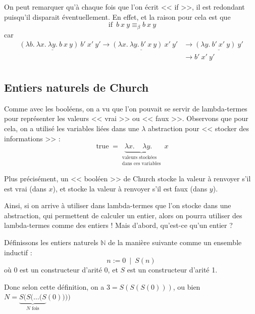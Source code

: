 \documentclass[11pt]{article}
\begin{document}
\begin{remark}
    On peut remarquer qu'à chaque fois que l'on écrit << if >>, il est redondant puisqu'il disparait éventuellement. En effet, et la raison pour cela est que
    $$\operatorname{if}~b~x~y \equiv_\beta b~x~y$$
    car
    \begin{equation*}
    \begin{aligned}
        \underline{\left(\lambda b.~\lambda x.~\lambda y.~b~x~y\right)~b'}~x'~y'\longrightarrow\underline{\left(\lambda x.~\lambda y.~b'~x~y\right)~x'}~y'&\longrightarrow\underline{\left(\lambda y.~b'~x'~y\right)~y'}\\&\longrightarrow b'~x'~y'\\
    \end{aligned}
    \end{equation*}
\end{remark}

\subsection{Entiers naturels de Church}

Comme avec les booléens, on a vu que l'on pouvait se servir de lambda-termes pour représenter les valeurs << vrai >> ou << faux >>. Observons que pour cela, on a utilisé les variables liées dans une $\lambda$ abstraction pour << stocker des informations >> :
$$\operatorname{true} = \underbrace{\lambda x.~~~~~\lambda y.~~~~}_{\substack{\text{valeurs stockées}\\\text{dans ces variables}}}~x$$

Plus précisément, un << booléen >> de Church stocke la valeur à renvoyer s'il est vrai (dans $x$), et stocke la valeur à renvoyer s'il est faux (dans $y$).

Ainsi, si on arrive à utiliser dans lambda-termes que l'on stocke dans une abstraction, qui permettent de calculer un entier, alors on pourra utiliser des lambda-termes comme des entiers ! Mais d'abord, qu'est-ce qu'un entier ?

\begin{definition}
    Définissons les entiers naturels $\mathbb{N}$ de la manière suivante comme un ensemble inductif :
    $$n := 0~\mid~S(n)$$
    où $0$ est un constructeur d'arité 0, et $S$ est un constructeur d'arité 1.
\end{definition}

Donc selon cette définition, on a $3=S(S(S(0)))$, ou bien $N=\underbrace{S(S(\dots(S}_\text{$N$ fois}(0))))$
\end{document}
